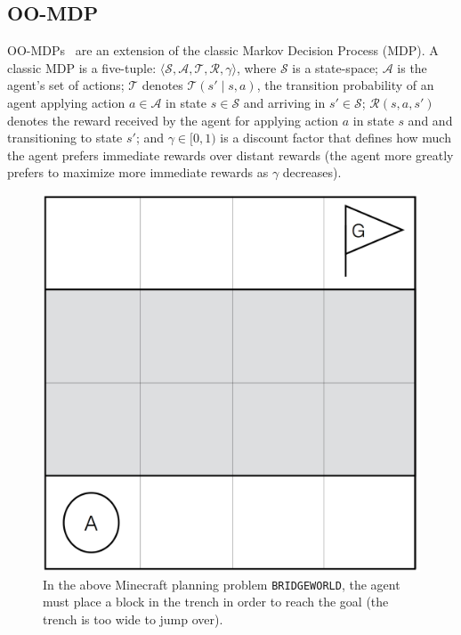 \documentclass[]{article}
\begin{document}

\subsection{OO-MDP}

OO-MDPs~\citep{diuk08} are an extension of the classic Markov Decision Process (MDP).
A classic MDP is a five-tuple: $\langle \mathcal{S}, \mathcal{A},
\mathcal{T}, \mathcal{R}, \gamma \rangle$, where $\mathcal{S}$ is a
state-space; $\mathcal{A}$ is the agent's set of actions;
$\mathcal{T}$ denotes $\mathcal{T}(s' \mid s,a)$, the transition
probability of an agent applying action $a \in \mathcal{A}$ in state
$s \in \mathcal{S}$ and arriving in $s' \in \mathcal{S}$;
$\mathcal{R}(s,a,s')$ denotes the reward received by the agent for applying
action $a$ in state $s$ and and transitioning to state $s'$; and 
$\gamma \in [0, 1)$ is a discount factor that defines how much the
agent prefers immediate rewards over distant rewards (the agent
more greatly prefers to maximize more immediate rewards as $\gamma$ decreases).

\begin{figure}
\centering
\includegraphics[scale=0.2]{figures/bridgeworld.png}
\caption{In the above Minecraft planning problem \texttt{BRIDGEWORLD},
the agent must place a block in the trench in order to reach the goal 
(the trench is too wide to jump over). \label{fig:bridgeworld}}
\end{figure}
\end{document}
